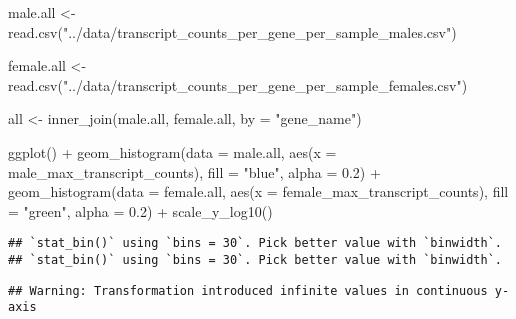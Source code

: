 \documentclass[
]{article}
\newenvironment{Shaded}{\begin{snugshade}}{\end{snugshade}}
\newcommand{\AttributeTok}[1]{\textcolor[rgb]{0.77,0.63,0.00}{#1}}
\newcommand{\FloatTok}[1]{\textcolor[rgb]{0.00,0.00,0.81}{#1}}
\newcommand{\FunctionTok}[1]{\textcolor[rgb]{0.00,0.00,0.00}{#1}}
\newcommand{\NormalTok}[1]{#1}
\newcommand{\OtherTok}[1]{\textcolor[rgb]{0.56,0.35,0.01}{#1}}
\newcommand{\SpecialCharTok}[1]{\textcolor[rgb]{0.00,0.00,0.00}{#1}}
\newcommand{\StringTok}[1]{\textcolor[rgb]{0.31,0.60,0.02}{#1}}
\begin{document}
\begin{Shaded}
\begin{Highlighting}[]
\NormalTok{male.all }\OtherTok{\textless{}{-}} \FunctionTok{read.csv}\NormalTok{(}\StringTok{"../data/transcript\_counts\_per\_gene\_per\_sample\_males.csv"}\NormalTok{)}
\end{Highlighting}
\end{Shaded}

\begin{Shaded}
\begin{Highlighting}[]
\NormalTok{female.all }\OtherTok{\textless{}{-}} \FunctionTok{read.csv}\NormalTok{(}\StringTok{"../data/transcript\_counts\_per\_gene\_per\_sample\_females.csv"}\NormalTok{)}
\end{Highlighting}
\end{Shaded}

\begin{Shaded}
\begin{Highlighting}[]
\NormalTok{all }\OtherTok{\textless{}{-}} \FunctionTok{inner\_join}\NormalTok{(male.all, female.all, }\AttributeTok{by =} \StringTok{"gene\_name"}\NormalTok{)}
\end{Highlighting}
\end{Shaded}

\begin{Shaded}
\begin{Highlighting}[]
\FunctionTok{ggplot}\NormalTok{() }\SpecialCharTok{+}
  \FunctionTok{geom\_histogram}\NormalTok{(}\AttributeTok{data =}\NormalTok{ male.all, }\FunctionTok{aes}\NormalTok{(}\AttributeTok{x =}\NormalTok{ male\_max\_transcript\_counts), }\AttributeTok{fill =} \StringTok{"blue"}\NormalTok{, }\AttributeTok{alpha =} \FloatTok{0.2}\NormalTok{) }\SpecialCharTok{+}
  \FunctionTok{geom\_histogram}\NormalTok{(}\AttributeTok{data =}\NormalTok{ female.all, }\FunctionTok{aes}\NormalTok{(}\AttributeTok{x =}\NormalTok{ female\_max\_transcript\_counts), }\AttributeTok{fill =} \StringTok{"green"}\NormalTok{, }\AttributeTok{alpha =} \FloatTok{0.2}\NormalTok{) }\SpecialCharTok{+}
  \FunctionTok{scale\_y\_log10}\NormalTok{()}
\end{Highlighting}
\end{Shaded}

\begin{verbatim}
## `stat_bin()` using `bins = 30`. Pick better value with `binwidth`.
## `stat_bin()` using `bins = 30`. Pick better value with `binwidth`.
\end{verbatim}

\begin{verbatim}
## Warning: Transformation introduced infinite values in continuous y-axis
\end{verbatim}
\end{document}
